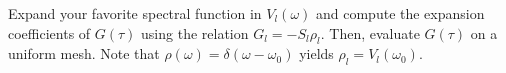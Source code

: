 \documentclass[submission, LectureNotes]{SciPost}
\newcommand\ee{\mathrm{e}}%
\newcommand\ii{\mathrm{i}}%
\newcommand\iw{\ii\omega}%
\begin{document}
\begin{Exercise}
    Expand your favorite spectral function in $V_l(\omega)$ and compute the expansion coefficients
    of $G(\tau)$ using the relation $G_l = -S_l \rho_l$.
    Then, evaluate $G(\tau)$ on a uniform mesh.
    Note that $\rho(\omega) = \delta(\omega-\omega_0)$ yields $\rho_l = V_l(\omega_0)$.
\end{Exercise}

%


%


%
\end{document}
